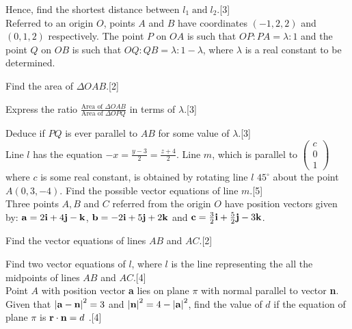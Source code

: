 \documentclass[12pt, a4 paper]{article}
\begin{document}
\begin{outline}[enumerate]
	\2 Hence, find the shortest distance between ${l_1}\;{\textrm{and}}\;{l_2}$.\hfill[3]\\
						
	\1 Referred to an origin $O$, points $A$ and $B$ have coordinates $(-1,2,2)$ and $(0,1,2)$ respectively. The point $P$ on $OA$ is such that $OP:PA = \lambda :1$ and the point $Q$ on $OB$ is such that $OQ:QB = \lambda :1 - \lambda $, where $\lambda $ is a real constant to be determined.
		
	\2 Find the area of $\Delta OAB$.\hfill[2]
					
	\2 Express the ratio $\frac{{{\textrm{Area of }}\Delta OAB}}{{{\textrm{Area of }}\Delta OPQ}}$ in terms of $\lambda $.\hfill[3]
					
	\2 Deduce if $PQ$ is ever parallel to $AB$ for some value of $\lambda$.\hfill[3]\\
									
	\1 Line $l$ has the equation $ - x = \frac{{y - 3}}{2} = \frac{{z + 4}}{2}$. Line $m$, which is parallel to $\left( {\begin{array}{*{20}{c}}c\\0\\1\end{array}} \right)$ where $c$ is some real constant, is obtained by rotating line $l$ $45^\circ $ about the point $A(0,3, - 4)$. Find the possible vector equations of line $m$.\hfill[5]\\
						
	\1 Three points $A, B$ and $C$ referred from the origin $O$ have position vectors given by:
	${\bf{a}} = 2{\bf{i}} + 4{\bf{j}} - {\bf{k}}$, ${\bf{b}} =  - 2{\bf{i}} + 5{\bf{j}} + 2{\bf{k}}$ and ${\bf{c}} = \frac{3}{2}{\bf{i}} + \frac{5}{2}{\bf{j}} - 3{\bf{k}}$.
		
	\2 Find the vector equations of lines $AB$ and $AC$.\hfill[2]
													            
	\2 Find two vector equations of $l$, where $l$ is the line representing the all the midpoints of lines $AB$ and $AC$.\hfill[4]\\
					
	\1 Point $A$ with position vector \textbf{a} lies on plane $\pi $ with normal parallel to vector \textbf{n}. Given that ${\left| {{\bf{a}} - {\bf{n}}} \right|^2} = 3$ and ${\left| {\bf{n}} \right|^2} = 4 - {\left| {\bf{a}} \right|^2}$, find the value of $d$ if the equation of plane $\pi $ is ${\bf{r}} \cdot {\bf{n}} = d$
	.\hfill[4]\\
						

\end{outline}
\end{document}
